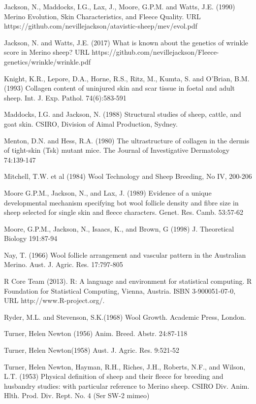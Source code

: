 \documentclass[titlepage]{article}  %
\begin{document}
\begin{thebibliography}{99}
Jackson, N., Maddocks, I.G., Lax, J., Moore, G.P.M. and Watts, J.E. (1990) Merino Evolution, Skin Characteristics, and Fleece Quality. URL https://github.com/nevillejackson/atavistic-sheep/mev/evol.pdf 

Jackson, N. and Watts, J.E. (2017) What is known about the genetics of wrinkle score in Merino sheep? URL https://github.com/nevillejackson/Fleece-genetics/wrinkle/wrinkle.pdf

Knight, K.R., Lepore, D.A., Horne, R.S., Ritz, M., Kumta, S. and O'Brian, B.M. (1993) Collagen content of uninjured skin and scar tissue in foetal and adult sheep. Int. J. Exp. Pathol. 74(6):583-591

Maddocks, I.G. and Jackson, N. (1988) Structural studies of sheep, cattle, and goat skin. CSIRO, Division of Aimal Production, Sydney.

Menton, D.N. and Hess, R.A. (1980) The ultrastructure of collagen in the dermis of tight-skin (Tsk) mutant mice. The Journal of Investigative Dermatology 74:139-147

Mitchell, T.W. et al (1984) Wool Technology and Sheep Breeding, No IV, 200-206

Moore G.P.M., Jackson, N., and Lax, J. (1989) Evidence of a unique developmental mechanism specifying bot wool follicle density and fibre size in sheep selected for single skin and fleece characters. Genet. Res. Camb. 53:57-62

Moore, G.P.M., Jackson, N., Isaacs, K., and Brown, G (1998) J. Theoretical Biology 191:87-94

Nay, T. (1966) Wool follicle arrangement and vascular pattern in the Australian Merino. Aust. J. Agric. Res. 17:797-805

R Core Team (2013). R: A language and environment for statistical
  computing. R Foundation for Statistical Computing, Vienna, Austria.
  ISBN 3-900051-07-0, URL http://www.R-project.org/.

Ryder, M.L. and Stevenson, S.K.(1968) Wool Growth. Academic Press, London.


Turner, Helen Newton (1956) Anim. Breed. Abstr. 24:87-118

Turner, Helen Newton(1958) Aust. J. Agric. Res. 9:521-52

Turner, Helen Newton, Hayman, R.H., Riches, J.H., Roberts, N.F., and Wilson, L.T. (1953) Physical definition of sheep and their fleece for breeding and husbandry studies: with particular reference to Merino sheep. CSIRO Div. Anim. Hlth. Prod. Div. Rept. No. 4 (Ser SW-2 mimeo)


\end{thebibliography}
\end{document}
